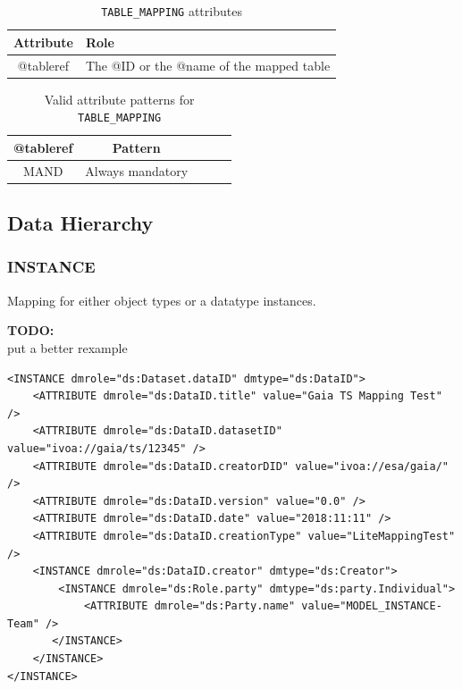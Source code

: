 \documentclass[11pt,a4paper]{ivoa}
\newcommand{\TODO}[1]{%
    \noindent%
    \colorbox{todocolor}{%
            \parbox{0.85\linewidth}{\sffamily \textbf{TODO:}\\
            #1}
    }%
    \vspace{2pt}

}
\begin{document}
\begin{table}[!htbp]
\small
\centering
\begin{tabulary}{\linewidth}{|c|J|}       
       \hline 
            \textbf{Attribute} & 
            \textbf {Role}\\
       \hline         \hline  
            @tableref  & 
            The @ID or the @name of the mapped table  \\
       \hline 
     \end{tabulary}
     \caption{\texttt{TABLE\_MAPPING} attributes} 
     \label{tbl:templ-att}
 \end{table}

\begin{table}[!htbp]
\small
\centering
\begin{tabulary}{\linewidth}{|c|c|c|c|J|}
    \hline 
        \textbf{@tableref} &
        \textbf{Pattern}\\
    \hline      \hline  
        MAND &   
        Always mandatory\\
   \hline 
\end{tabulary}
     \caption{Valid attribute patterns for  \texttt{TABLE\_MAPPING}} 
     \label{tbl:templ-pattern}
 \end{table}
\FloatBarrier

%
%
\subsection{Data Hierarchy}

%
%

\subsubsection{INSTANCE}

Mapping for either object types or a datatype instances.

\TODO{ put a better rexample}

\begin{lstlisting}[caption={INSTANCE block example},style=XML]
<INSTANCE dmrole="ds:Dataset.dataID" dmtype="ds:DataID">
    <ATTRIBUTE dmrole="ds:DataID.title" value="Gaia TS Mapping Test" />
    <ATTRIBUTE dmrole="ds:DataID.datasetID" value="ivoa://gaia/ts/12345" />
    <ATTRIBUTE dmrole="ds:DataID.creatorDID" value="ivoa://esa/gaia/" />
    <ATTRIBUTE dmrole="ds:DataID.version" value="0.0" />
    <ATTRIBUTE dmrole="ds:DataID.date" value="2018:11:11" />
    <ATTRIBUTE dmrole="ds:DataID.creationType" value="LiteMappingTest" />
    <INSTANCE dmrole="ds:DataID.creator" dmtype="ds:Creator">
        <INSTANCE dmrole="ds:Role.party" dmtype="ds:party.Individual">
            <ATTRIBUTE dmrole="ds:Party.name" value="MODEL_INSTANCE-Team" />
       </INSTANCE>
    </INSTANCE>
</INSTANCE>
\end{lstlisting}
\end{document}
